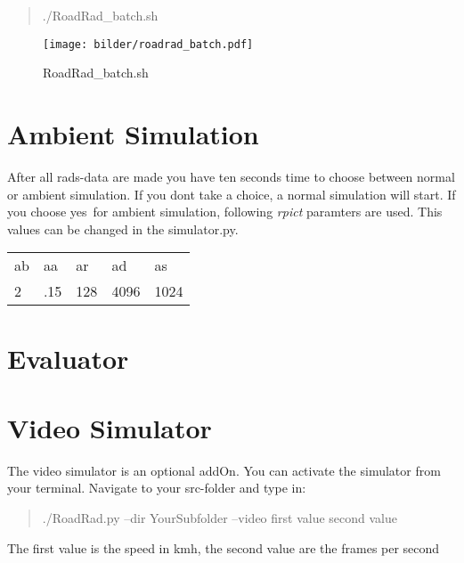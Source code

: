 \documentclass[10pt,a4paper]{report}
\begin{document}
\begin{quote}
./RoadRad\_batch.sh
\end{quote}

\begin{figure}[H]
\texttt{[image: bilder/roadrad\_batch.pdf]} 
\caption{RoadRad\_batch.sh}
\end{figure}

\section{Ambient Simulation}
After all rads-data are made you have ten seconds time to choose between normal or ambient simulation. If you dont take a choice, a normal simulation will start. If you choose \glqq yes\grqq\ for ambient simulation, following \textit{rpict} paramters are used.
This values can be changed in the simulator.py.

\renewcommand{\arraystretch}{1.5}
	\begin{longtable}{p{3cm}p{3cm}p{3cm}p{3cm}p{3cm}}
		
		\rowcolor{dunkelgrau}
			ab & aa & ar & ad & as \\
		
			2 & .15 & 128 & 4096 & 1024 \\
		
	\end{longtable} 

\section{Evaluator}

\section{Video Simulator}
The video simulator is an optional addOn. You can activate the simulator from your terminal. Navigate to your src-folder and type in:

\begin{quote}
./RoadRad.py --dir YourSubfolder --video first value second value
\end{quote} 
The first value is the speed in kmh, the second value are the frames per second
\end{document}
